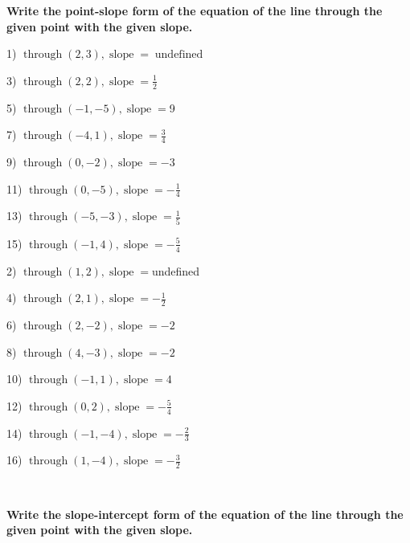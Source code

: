 \documentclass[11pt]{book}
\newcommand{\tmop}[1]{\ensuremath{\operatorname{#1}}}
\newcommand{\tmstrong}[1]{\textbf{#1}}
\theoremstyle{definition}  %
\begin{document}
{\tmstrong{Write the point-slope form of the equation of the line through the
given point with the given slope.}}

\begin{multicols}{2}
  1) $\tmop{through} (2, 3), \tmop{slope} = \tmop{undefined}$
  
  3) $\tmop{through} (2, 2), \tmop{slope} = \frac{1}{2}$
  
  5) $\tmop{through} (- 1, - 5), \tmop{slope} =$9
  
  7) $\tmop{through} (- 4, 1), \tmop{slope} = \frac{3}{4}$
  
  9) $\tmop{through} (0, - 2), \tmop{slope} = - 3$
  
  11) $\tmop{through} (0, - 5), \tmop{slope} = - \frac{1}{4}$
  
  13) $\tmop{through} (- 5, - 3), \tmop{slope} = \frac{1}{5}$
  
  15) $\tmop{through} (- 1, 4), \tmop{slope} = - \frac{5}{4}$
  
  2) $\tmop{through} (1, 2), \tmop{slope} =$undefined
  
  4) $\tmop{through} (2, 1), \tmop{slope} = - \frac{1}{2}$
  
  6) $\tmop{through} (2, - 2), \tmop{slope} = - 2$
  
  8) $\tmop{through} (4, - 3), \tmop{slope} = - 2$
  
  10) $\tmop{through} (- 1, 1), \tmop{slope} = 4$
  
  12) $\tmop{through} (0, 2), \tmop{slope} = - \frac{5}{4}$
  
  14) $\tmop{through} (- 1, - 4), \tmop{slope} = - \frac{2}{3}$
  
  16) $\tmop{through} (1, - 4), \tmop{slope} = - \frac{3}{2}$
\end{multicols}

\

{\tmstrong{Write the slope-intercept form of the equation of the line through
the given point with the given slope.}}
\end{document}
